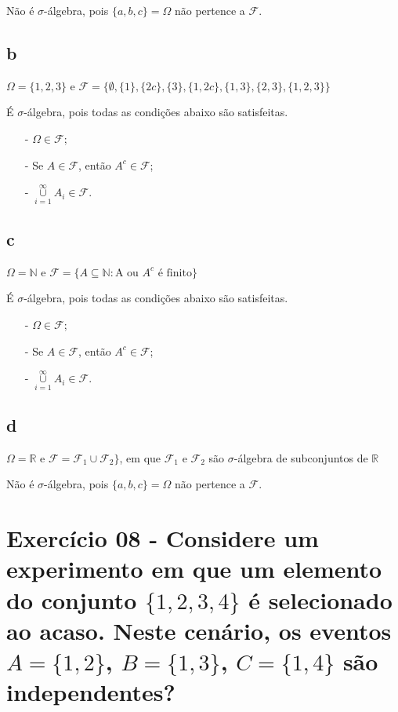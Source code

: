 \documentclass[12pt]{article}
\begin{document}
Não é $\sigma$-álgebra, pois $\{a,b,c\}=\Omega$ não pertence a $\mathcal{F}$.

\subsection*{b}
$\Omega = \{ 1,2,3\}$ e $\mathcal{F}= \{\emptyset, \{1\}, \{2c\}, \{3\}, \{1,2c\}, \{1,3\}, \{2,3\}, \{1,2,3\} \}$

É $\sigma$-álgebra, pois todas as condições abaixo são satisfeitas.

\begin{itemize}
\item[-] $\Omega \in \mathcal{F}$;
\item[-] Se $A \in \mathcal{F}$, então $A^c \in \mathcal{F}$;
\item[-] $\overset{\infty}{\underset{i=1}{\cup}} A_i \in \mathcal{F}$.
\end{itemize}

\subsection*{c}
$\Omega = \mathbb{N}$ e $\mathcal{F}=\{ A \subseteq \mathbb{N}: \text{A ou } A^c \text{ é finito} \}$

É $\sigma$-álgebra, pois todas as condições abaixo são satisfeitas.

\begin{itemize}
\item[-] $\Omega \in \mathcal{F}$;
\item[-] Se $A \in \mathcal{F}$, então $A^c \in \mathcal{F}$;
\item[-] $\overset{\infty}{\underset{i=1}{\cup}} A_i \in \mathcal{F}$.
\end{itemize}

\subsection*{d}
$\Omega = \mathbb{R}$ e $\mathcal{F}=\mathcal{F_1} \cup \mathcal{F_2} \}$, em que $\mathcal{F_1}$ e $\mathcal{F_2}$ são $\sigma$-álgebra de subconjuntos de $\mathbb{R}$

Não é $\sigma$-álgebra, pois $\{a,b,c\}=\Omega$ não pertence a $\mathcal{F}$.

\section*{Exercício 08 - Considere um experimento em que um elemento do conjunto $\{1,2,3,4\}$ é selecionado ao acaso. Neste cenário, os eventos $A=\{1,2\}$, $B=\{1,3\}$, $C=\{1,4\}$ são independentes?}
\end{document}
